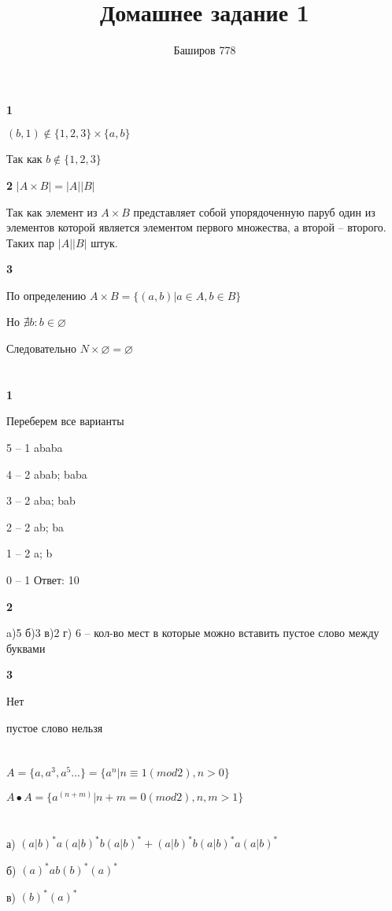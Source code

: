 \documentclass[a4paper,12pt]{article}
\author{Баширов 778}
\title{Домашнее задание 1}
\begin{document}
\maketitle
\newpage
\section{}

\textbf{1}

$(b,1)\notin\{1,2,3\}\times\{a,b\}$

Так как $b\notin\{1,2,3\}$

\textbf{2}
$\vert A \times B \vert = \vert A \vert \vert B \vert$

Так как элемент из $A \times B$ представляет собой упорядоченную паруб один из элементов которой является элементом первого множества, а второй -- второго.
Таких пар $\vert A \vert \vert B \vert$ штук.

\textbf{3}

По определению $A \times B = \{ (a,b) \vert a \in A,b \in B \}$

Но $\nexists b : b \in \varnothing$

Следовательно $N \times \varnothing = \varnothing$

\section{}

\textbf{1}

Переберем все варианты

5 -- 1 ababa

4 -- 2 abab; baba

3 -- 2 aba; bab

2 -- 2 ab; ba

1 -- 2 a; b

0 -- 1 
Ответ: 10

\textbf{2}

a)5 б)3 в)2
г) 6 -- кол-во мест в которые можно вставить пустое слово между буквами

\textbf{3}

Нет

пустое слово нельзя

\section{}

$A = \{a,a^3,a^5...\} = \{a^n\vert n\equiv1(mod 2), n > 0\}$

$A \bullet A = \{a^(n+m) \vert n+m=0(mod 2), n,m > 1 \}$ 

\section{} 

а) $(a \vert b)^*a(a \vert b)^*b(a \vert b)^* + (a \vert b)^*b(a \vert b)^*a(a \vert b)^*$

б) $(a)^*ab(b)^*(a)^*$

в) $(b)^*(a)^*$
  
\end{document}
